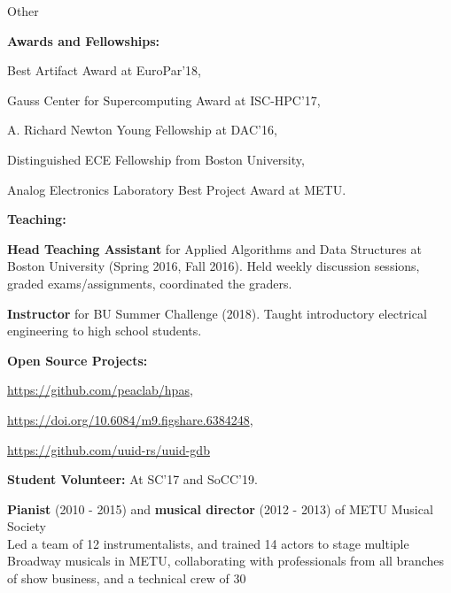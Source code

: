\documentclass{resume}
\begin{document}
\begin{rSection}{Other} \itemsep -3pt
\item {\bf Awards and Fellowships:}
  \begin{rList}
  \item Best Artifact Award at EuroPar'18,
  \item Gauss Center for Supercomputing Award at ISC-HPC'17,
  \item A. Richard Newton Young Fellowship at DAC'16,
  \item Distinguished ECE Fellowship from Boston University,
  \item Analog Electronics Laboratory Best Project Award at METU.
  \end{rList}
\item {\bf Teaching:}
  \begin{rList}
  \item {\bf Head Teaching Assistant} for Applied Algorithms and Data Structures
    at Boston University (Spring 2016, Fall 2016). Held weekly discussion
    sessions, graded exams/assignments, coordinated the graders.
  \item {\bf Instructor} for BU Summer Challenge (2018). Taught introductory
    electrical engineering to high school students.
  \end{rList}
\item {\bf Open Source Projects:}
  \begin{rList}
  \item \url{https://github.com/peaclab/hpas},
  \item \url{https://doi.org/10.6084/m9.figshare.6384248},
  \item \url{https://github.com/uuid-rs/uuid-gdb}
  \end{rList}
\item {\bf Student Volunteer:} At SC'17 and SoCC'19.
\item {\bf Pianist} (2010 - 2015) and {\bf musical director} (2012 - 2013) of
  METU Musical Society \\
  Led a team of 12 instrumentalists, and trained 14 actors to stage multiple
  Broadway musicals in METU, collaborating with professionals from all branches
  of show business, and a technical crew of 30

\end{rSection}
\end{document}
